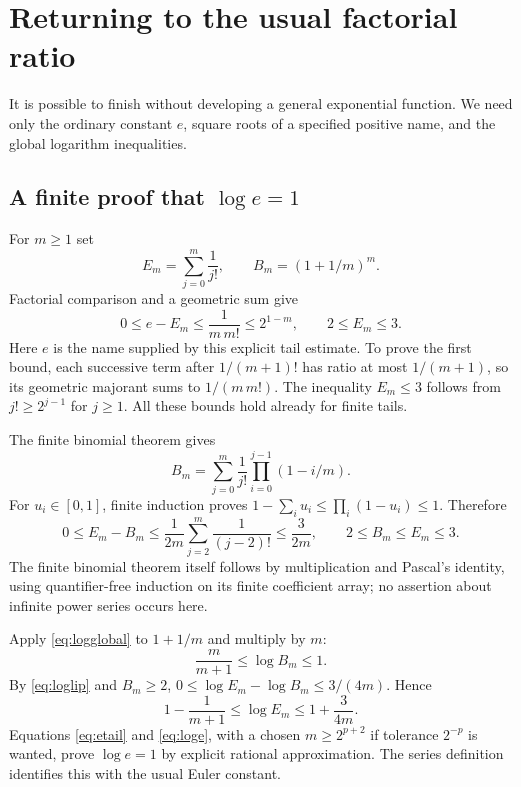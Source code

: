 \documentclass[11pt]{article}
\theoremstyle{definition}
\begin{document}
\section{Returning to the usual factorial ratio}
\label{sec:exp}

It is possible to finish without developing a general exponential
function. We need only the ordinary constant $e$, square roots of a
specified positive name, and the global logarithm inequalities.

\subsection{A finite proof that \texorpdfstring{$\log e=1$}{log e = 1}}

For $m\ge1$ set
\[
 E_m=\sum_{j=0}^m\frac1{j!},\qquad
 B_m=(1+1/m)^m.
\]
Factorial comparison and a geometric sum give
\begin{equation}\label{eq:etail}
 0\le e-E_m\le\frac1{m\,m!}\le2^{1-m},
 \qquad 2\le E_m\le3.
\end{equation}
Here $e$ is the name supplied by this explicit tail estimate. To prove
the first bound, each successive term after $1/(m+1)!$ has ratio
at most $1/(m+1)$, so its geometric majorant sums to $1/(m\,m!)$.
The inequality $E_m\le3$ follows from $j!\ge2^{j-1}$ for $j\ge1$.
All these bounds hold already for finite tails.

The finite binomial theorem gives
\[
 B_m=\sum_{j=0}^m\frac1{j!}
             \prod_{i=0}^{j-1}(1-i/m).
\]
For $u_i\in[0,1]$, finite induction proves
$1-\sum_i u_i\le\prod_i(1-u_i)\le1$. Therefore
\begin{equation}\label{eq:EB}
 0\le E_m-B_m\le\frac1{2m}\sum_{j=2}^m\frac1{(j-2)!}
 \le\frac3{2m},\qquad 2\le B_m\le E_m\le3.
\end{equation}
The finite binomial theorem itself follows by multiplication and Pascal's
identity, using quantifier-free induction on its finite coefficient
array; no assertion about infinite power series occurs here.

Apply \eqref{eq:logglobal} to $1+1/m$ and multiply by $m$:
\[
 \frac{m}{m+1}\le\log B_m\le1.
\]
By \eqref{eq:loglip} and $B_m\ge2$,
$0\le\log E_m-\log B_m\le3/(4m)$. Hence
\begin{equation}\label{eq:loge}
 1-\frac1{m+1}\le\log E_m\le1+\frac3{4m}.
\end{equation}
Equations \eqref{eq:etail} and \eqref{eq:loge}, with a chosen
$m\ge2^{p+2}$ if tolerance $2^{-p}$ is wanted, prove
$\log e=1$ by explicit rational approximation. The series definition
identifies this with the usual Euler constant.
\end{document}
